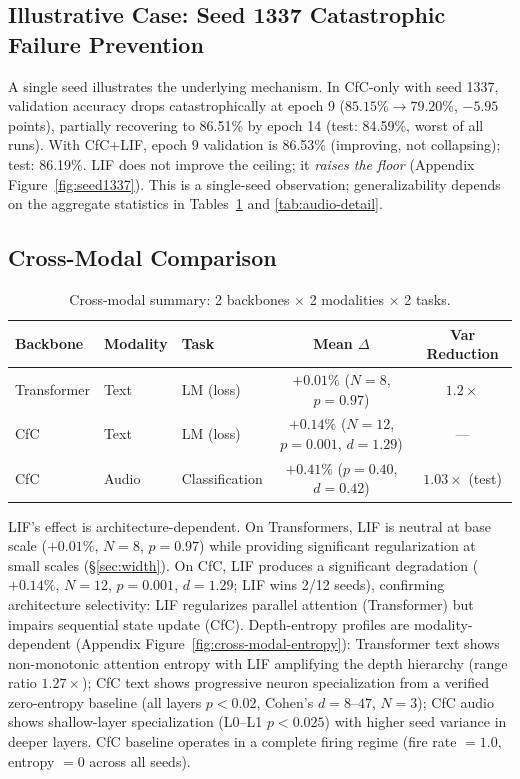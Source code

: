 \documentclass[11pt]{article}
\begin{document}
\subsection{Illustrative Case: Seed 1337 Catastrophic Failure Prevention}
\label{sec:seed1337}

A single seed illustrates the underlying mechanism. In CfC-only with seed 1337, validation accuracy drops catastrophically at epoch 9 ($85.15\% \to 79.20\%$, $-5.95$ points), partially recovering to 86.51\% by epoch 14 (test: 84.59\%, worst of all runs). With CfC+LIF, epoch 9 validation is 86.53\% (improving, not collapsing); test: 86.19\%. LIF does not improve the ceiling; it \emph{raises the floor} (Appendix Figure~\ref{fig:seed1337}). This is a single-seed observation; generalizability depends on the aggregate statistics in Tables~\ref{tab:cross-modal} and \ref{tab:audio-detail}.

\subsection{Cross-Modal Comparison}
\label{sec:cross-modal}

\begin{table}[h]
\centering
\caption{Cross-modal summary: 2 backbones $\times$ 2 modalities $\times$ 2 tasks.}
\label{tab:cross-modal}
\begin{tabular}{lllcc}
\toprule
\textbf{Backbone} & \textbf{Modality} & \textbf{Task} & \textbf{Mean $\Delta$} & \textbf{Var Reduction} \\
\midrule
Transformer & Text & LM (loss) & $+0.01\%$ ($N{=}8$, $p{=}0.97$) & $1.2\times$ \\
CfC & Text & LM (loss) & $+0.14\%$ ($N{=}12$, $p{=}0.001$, $d{=}1.29$) & --- \\
CfC & Audio & Classification & $+0.41\%$ ($p{=}0.40$, $d{=}0.42$) & $1.03\times$ (test) \\
\bottomrule
\end{tabular}
\end{table}

LIF's effect is architecture-dependent. On Transformers, LIF is neutral at base scale ($+0.01\%$, $N{=}8$, $p{=}0.97$) while providing significant regularization at small scales (\S\ref{sec:width}). On CfC, LIF produces a significant degradation ($+0.14\%$, $N{=}12$, $p{=}0.001$, $d{=}1.29$; LIF wins 2/12 seeds), confirming architecture selectivity: LIF regularizes parallel attention (Transformer) but impairs sequential state update (CfC). Depth-entropy profiles are modality-dependent (Appendix Figure~\ref{fig:cross-modal-entropy}): Transformer text shows non-monotonic attention entropy with LIF amplifying the depth hierarchy (range ratio $1.27\times$); CfC text shows progressive neuron specialization from a verified zero-entropy baseline (all layers $p < 0.02$, Cohen's $d = 8$--$47$, $N{=}3$); CfC audio shows shallow-layer specialization (L0--L1 $p < 0.025$) with higher seed variance in deeper layers. CfC baseline operates in a complete firing regime (fire rate $= 1.0$, entropy $= 0$ across all seeds).
\end{document}
